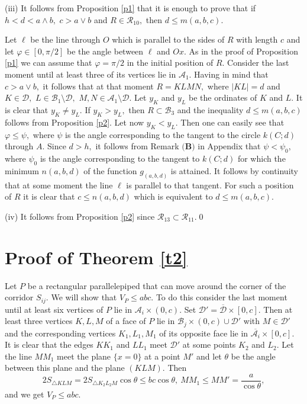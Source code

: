 \documentclass[12pt]{amsart}
\def\A{\mathcal A}
\def\B{\mathcal B}
\def\D{\mathcal D}
\def\R{\mathcal R}
\def\s{\smallskip}
\def\v{\varphi}
\def\w{\wedge}
\def\t{\triangle}
\def\o{\overline}
\def\ss{\subset}
\begin{document}
\s

(iii) It follows from Proposition \ref{p1} that it is enough to
prove that if  $h<d<a\w b,$ $c>a\vee b$ and $R\in\R_{10},$ then
$d\le m(a,b,c).$

Let $\ell$ be the line through $O$ which is parallel to the sides
of $R$ with length $c$ and let  $\v\in [0,\pi/2]$ be the angle
between $\ell$ and $Ox$. As in the proof of Proposition \ref{p1}
we can assume that $\v=\pi/2$ in the initial position of $R$.
Consider the last moment until at least three of its vertices lie
in $\A_{1}$. Having in mind that $c>a\vee b,$ it follows that at
that moment $R=KLMN,$ where $|KL|=d$ and $K\in\D,$
$L\in\B_1\setminus\D,$ $M,N\in\A_1\setminus\D .$ Let $y_K$ and
$y_L$ be the ordinates of $K$ and $L$. It is clear that $y_K\neq
y_L$. If $y_K>y_L,$ then  $R\subset \B_3$ and the inequality
$d\le m(a,b,c)$ follows from Proposition \ref{p2}. Let now
$y_K<y_L$. Then one can easily see that $\v\le\psi,$ where $\psi$
is the angle corresponding to the tangent to the circle $k(C;d)$
through $A$. Since $d>h,$ it follows from Remark $\textbf{(B)}$ in
Appendix that $\psi<\psi_0,$ where $\psi_0$ is the angle
corresponding to the tangent to $k(C;d)$ for which the minimum
$n(a,b,d)$ of the function $g_{(a,b,d)}$ is attained. It follows
by continuity that at some moment the line $\ell$ is parallel to
that tangent. For such a position of $R$ it is clear that $c\le
n(a,b,d)$ which is equivalent to $d\le m(a,b,c).$

\s

(iv) It follows from Proposition \ref{p2} since $\R_{13}\ss
\R_{11}$.\qed

\section{Proof of Theorem \ref{t2}}

Let  $P$ be a rectangular parallelepiped that can move around the
corner of the corridor $S_{ij}$. We will show that $V_P\le abc .$
To do  this consider the last moment until at least six vertices
of $P$ lie in $\A_i\times (0,c)$. Set $\D'=\o{\D}\times[0,c].$
Then at least three vertices $K, L , M$ of a face of $P$ lie in
$\B_j\times (0,c)\cup\D'$ with $M\in\D' $ and the corresponding
vertices $K_1, L_1, M_1$ of its opposite face lie in
$\o{\A_{i}}\times[0,c].$ It is clear that the edges $KK_1$ and
$LL_1$ meet $\D' $ at some points $K_2$ and $L_2.$ Let the line
$MM_1$ meet the plane $\{x=0\}$ at a point $M'$ and let $\theta$
be the angle between this plane and the plane $(KLM).$ Then
$$2S_{\t KLM}=2S_{\t K_2L_2M}\cos\theta\le bc\cos\theta,\ MM_1\le
MM'= \frac{a}{\cos\theta},$$ and we get $V_{P}\le abc.$
\end{document}
